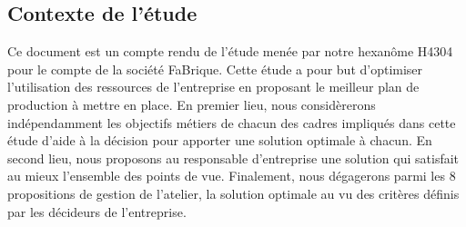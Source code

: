 \documentclass[12pt]{article}
\begin{document}
\subsection{Contexte de l'étude}
Ce document est un compte rendu de l'étude menée par notre hexanôme H4304 pour le compte de la société FaBrique. Cette étude a pour but d'optimiser l'utilisation des ressources de l'entreprise en proposant le meilleur plan de production à mettre en place. \newline
En premier lieu, nous considèrerons indépendamment les objectifs métiers de chacun des cadres impliqués dans cette étude d'aide à la décision pour apporter une solution optimale à chacun.
En second lieu, nous proposons au responsable d'entreprise une solution qui satisfait au mieux l'ensemble des points de vue.
Finalement, nous dégagerons parmi les 8 propositions de gestion de l'atelier, la solution optimale au vu des critères définis par les décideurs de l'entreprise.    
\end{document}
